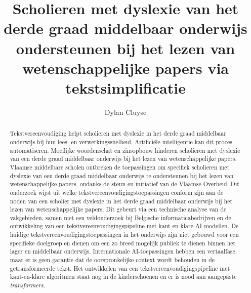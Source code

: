 \documentclass{hogent-article}
\title{Scholieren met dyslexie van het derde graad middelbaar onderwijs ondersteunen bij het lezen van wetenschappelijke papers via tekstsimplificatie}
\author{Dylan Cluyse}
\begin{document}
\begin{abstract}
Tekstvereenvoudiging helpt scholieren met dyslexie in het derde graad middelbaar onderwijs bij hun lees- en verwerkingssnelheid. Artificiële intelligentie kan dit proces automatiseren. Moeilijke woordenschat en zinsopbouw hinderen scholieren met dyslexie van een derde graad middelbaar onderwijs bij het lezen van wetenschappelijke papers. Vlaamse middelbare scholen ontbreken de toepassingen om specifiek scholieren met dyslexie van een derde graad middelbaar onderwijs te ondersteunen bij het lezen van wetenschappelijke papers, ondanks de steun en initiatief van de Vlaamse Overheid. Dit onderzoek wijst uit welke tekstvereenvoudigingstoepassingen conform zijn aan de noden van een scholier met dyslexie in het derde graad middelbaar onderwijs bij het lezen van wetenschappelijke papers.  Dit gebeurt via een technische analyse van de vakgebieden, samen met een veldonderzoek bij Belgische informaticabedrijven en de ontwikkeling van een tekstvereenvoudigingspipeline met kant-en-klare AI-modellen. De huidige tekstvereenvoudigingstoepassingen in het onderwijs zijn niet gebouwd voor een specifieke doelgroep en dienen om een zo breed mogelijk publiek te dienen binnen het lager en middelbaar onderwijs. Internationale AI-toepassingen hebben een vertaalfase, maar er is geen garantie dat de oorspronkelijke context wordt behouden in de getransformeerde tekst. Het ontwikkelen van een tekstvereenvoudigingspipeline met kant-en-klare algoritmen staat nog in de kinderschoenen en er is nood aan aangepaste \textit{transformers}.
\end{abstract}

\tableofcontents



\printbibliography[heading=bibintoc]
\end{document}
